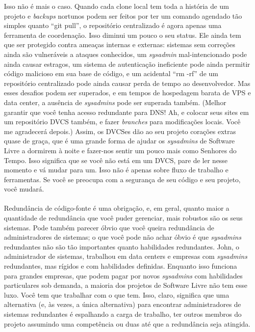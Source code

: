 Isso não é mais o caso. Quando cada clone local tem toda a história de um projeto
e \textit{backups} nortunos podem ser feitos por ter um comando agendado tão simples
quanto ``git pull'', o repositório centralizado é agora apenas uma ferramenta de
coordenação. Isso diminui um pouco o seu status. Ele ainda tem que ser protegido
contra ameaças internas e externas: sistemas sem correções ainda são vulneráveis
a ataques conhecidos, um \textit{sysadmin} mal-intencionado pode ainda causar estragos,
um sistema de autenticação ineficiente pode ainda permitir código malicioso em sua
base de código, e um acidental ``rm -rf'' de um repositório centralizado pode ainda
causar perda de tempo ao desenvolvedor. Mas esses desafios podem ser superados, e em
tempos de hospedagem barata de VPS e data center, a ausência de \textit{sysadmins}
pode ser superada também. (Melhor garantir que você tenha acesso redundante para DNS!
Ah, e colocar seus sites em um repositório DVCS também, e fazer \textit{branches}
para modificações locais. Você me agradecerá depois.) Assim, os DVCSes dão ao seu
projeto corações extras quase de graça, que é uma grande forma de ajudar os \textit{sysadmins}
de Software Livre a dormirem à noite e fazer-nos sentir um pouco mais como Senhores do Tempo.
Isso significa que se você não está em um DVCS, pare de ler nesse momento e vá mudar para um.
Isso não é apenas sobre fluxo de trabalho e ferramentas. Se você se preocupa com a segurança
de seu código e seu projeto, você mudará.

\paragraph*{}Redundância de código-fonte é uma obrigação, e, em geral,
quanto maior a quantidade de redundância que você puder gerenciar, mais
robustos são os seus sistemas. Pode também parecer óbvio que você queira
redundância de administradores de sistemas; o que você pode não achar óbvio
é que \textit{sysadmins} redundantes não são tão importantes quanto
habilidades redundantes. John, o administrador de sistemas, trabalhou
em data centers e empresas com \textit{sysadmins} redundantes, mas rígidos e
com habilidades definidas. Enquanto isso funciona para grandes empresas,
que podem pagar por novos \textit{sysadmins} com habilidades particulares
sob demanda, a maioria dos projetos de Software Livre não tem esse luxo. 
Você tem que trabalhar com o que tem. Isso, claro, significa que uma
alternativa (e, às vezes, a única alternativa) para encontrar administradores
de sistemas redundantes é espalhando a carga de trabalho, ter outros
membros do projeto assumindo uma competência ou duas até que a redundância
seja atingida.

